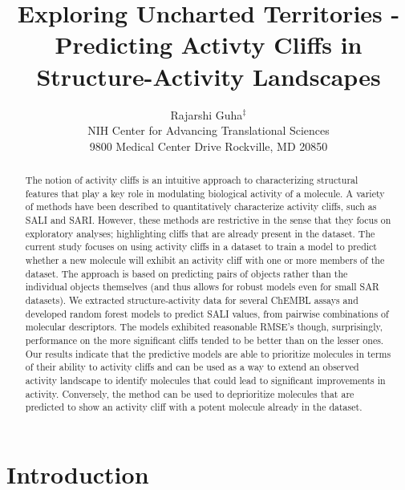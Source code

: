 \documentclass[letterpaper, 12pt]{article}
\begin{document}
\title{Exploring Uncharted Territories - Predicting Activty Cliffs in
  Structure-Activity Landscapes}
\author{Rajarshi Guha${}^{\ddagger}$\\
NIH Center for Advancing Translational Sciences \\ 9800 Medical Center Drive  Rockville, MD 20850}
\date{}

\maketitle
\begin{abstract}
  The notion of activity cliffs is an intuitive approach to
  characterizing structural features that play a key role in
  modulating biological activity of a molecule. A variety of methods
  have been described to quantitatively characterize activity cliffs,
  such as SALI and SARI. However, these methods are restrictive in the
  sense that they focus on exploratory analyses; highlighting cliffs
  that are already present in the dataset. The current study focuses
  on using activity cliffs in a dataset to train a model to predict
  whether a new molecule will exhibit an activity cliff with one or
  more members of the dataset. The approach is based on predicting
  pairs of objects rather than the individual objects themselves (and
  thus allows for robust models even for small SAR datasets). We
  extracted structure-activity data for several ChEMBL assays and
  developed random forest models to predict SALI values, from pairwise
  combinations of molecular descriptors. The models exhibited
  reasonable RMSE's though, surprisingly, performance on the more
  significant cliffs tended to be better than on the lesser ones. Our
  results indicate that the predictive models are able to prioritize
  molecules in terms of their ability to activity cliffs and can be
  used as a way to extend an observed activity landscape to identify
  molecules that could lead to significant improvements in
  activity. Conversely, the method can be used to deprioritize
  molecules that are predicted to show an activity cliff with a potent
  molecule already in the dataset.
\end{abstract}

\section{Introduction}
\end{document}
